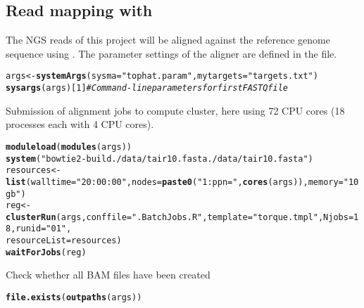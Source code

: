 \documentclass{article}\usepackage[]{graphicx}\usepackage[]{color}
\makeatletter
\newcommand{\hlnum}[1]{\textcolor[rgb]{0.686,0.059,0.569}{#1}}%
\newcommand{\hlstr}[1]{\textcolor[rgb]{0.192,0.494,0.8}{#1}}%
\newcommand{\hlcom}[1]{\textcolor[rgb]{0.678,0.584,0.686}{\textit{#1}}}%
\newcommand{\hlstd}[1]{\textcolor[rgb]{0.345,0.345,0.345}{#1}}%
\newcommand{\hlkwb}[1]{\textcolor[rgb]{0.69,0.353,0.396}{#1}}%
\newcommand{\hlkwc}[1]{\textcolor[rgb]{0.333,0.667,0.333}{#1}}%
\newcommand{\hlkwd}[1]{\textcolor[rgb]{0.737,0.353,0.396}{\textbf{#1}}}%
\newenvironment{kframe}{%
 \def\at@end@of@kframe{}%
 \ifinner\ifhmode%
  \def\at@end@of@kframe{\end{minipage}}%
  \begin{minipage}{\columnwidth}%
 \fi\fi%
 \def\FrameCommand##1{\hskip\@totalleftmargin \hskip-\fboxsep
 \colorbox{shadecolor}{##1}\hskip-\fboxsep
     \hskip-\linewidth \hskip-\@totalleftmargin \hskip\columnwidth}%
 \MakeFramed {\advance\hsize-\width
   \@totalleftmargin\z@ \linewidth\hsize
   \@setminipage}}%
 {\par\unskip\endMakeFramed%
 \at@end@of@kframe}
\newenvironment{knitrout}{}{} %
\makeatother
\begin{document}
\subsection{Read mapping with }
The NGS reads of this project will be aligned against the reference genome sequence using  \citep{Kim2013-vg, Langmead2012-bs}. The parameter settings of the aligner are defined in the  file.
\begin{knitrout}
\color{fgcolor}\begin{kframe}
\begin{alltt}
\hlstd{args} \hlkwb{<-} \hlkwd{systemArgs}\hlstd{(}\hlkwc{sysma}\hlstd{=}\hlstr{"tophat.param"}\hlstd{,} \hlkwc{mytargets}\hlstd{=}\hlstr{"targets.txt"}\hlstd{)}
\hlkwd{sysargs}\hlstd{(args)[}\hlnum{1}\hlstd{]} \hlcom{# Command-line parameters for first FASTQ file}
\end{alltt}
\end{kframe}
\end{knitrout}
Submission of alignment jobs to compute cluster, here using 72 CPU cores (18  processes each with 4 CPU cores).
\begin{knitrout}
\color{fgcolor}\begin{kframe}
\begin{alltt}
\hlkwd{moduleload}\hlstd{(}\hlkwd{modules}\hlstd{(args))}
\hlkwd{system}\hlstd{(}\hlstr{"bowtie2-build ./data/tair10.fasta ./data/tair10.fasta"}\hlstd{)}
\hlstd{resources} \hlkwb{<-} \hlkwd{list}\hlstd{(}\hlkwc{walltime}\hlstd{=}\hlstr{"20:00:00"}\hlstd{,} \hlkwc{nodes}\hlstd{=}\hlkwd{paste0}\hlstd{(}\hlstr{"1:ppn="}\hlstd{,} \hlkwd{cores}\hlstd{(args)),} \hlkwc{memory}\hlstd{=}\hlstr{"10gb"}\hlstd{)}
\hlstd{reg} \hlkwb{<-} \hlkwd{clusterRun}\hlstd{(args,} \hlkwc{conffile}\hlstd{=}\hlstr{".BatchJobs.R"}\hlstd{,} \hlkwc{template}\hlstd{=}\hlstr{"torque.tmpl"}\hlstd{,} \hlkwc{Njobs}\hlstd{=}\hlnum{18}\hlstd{,} \hlkwc{runid}\hlstd{=}\hlstr{"01"}\hlstd{,}
                  \hlkwc{resourceList}\hlstd{=resources)}
\hlkwd{waitForJobs}\hlstd{(reg)}
\end{alltt}
\end{kframe}
\end{knitrout}
Check whether all BAM files have been created
\begin{knitrout}
\color{fgcolor}\begin{kframe}
\begin{alltt}
\hlkwd{file.exists}\hlstd{(}\hlkwd{outpaths}\hlstd{(args))}
\end{alltt}
\end{kframe}
\end{knitrout}
\end{document}
